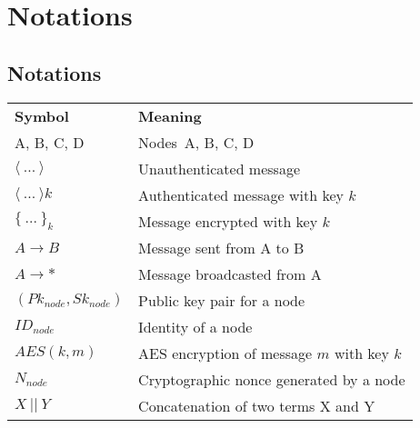 \chapter{Notations}

\section{Notations}
\label{app:notations}

\begin{tcolorbox}[title=Notations used in protocol specifications]
\begin{tabular}{ll}
\multicolumn{1}{p{1.3cm}}{\textbf{Symbol}} & \multicolumn{1}{p{4cm}}{\textbf{Meaning}}\\
A, B, C, D & Nodes\ A, B, C, D\\
$\langle{\ ...\ }\rangle{}$ & Unauthenticated message\\
$\langle{\ ...\ }\rangle{k}$ & Authenticated message with key $k$\\
$\{\ ...\ \}_k$ & Message encrypted with key $k$\\
$A \rightarrow B$ & Message sent from A to B\\
$A \rightarrow *$ & Message broadcasted from A\\
$(Pk_{node}, Sk_{node})$ & Public key pair for a node \\
$ID_{node}$ & Identity of a node\\
$AES(k, m)$ & AES encryption of message $m$ with key $k$\\
$N_{node}$ & Cryptographic nonce generated by a node\\
$X\ ||\ Y$ & Concatenation of two terms X and Y\\ 
\end{tabular}
\end{tcolorbox}


